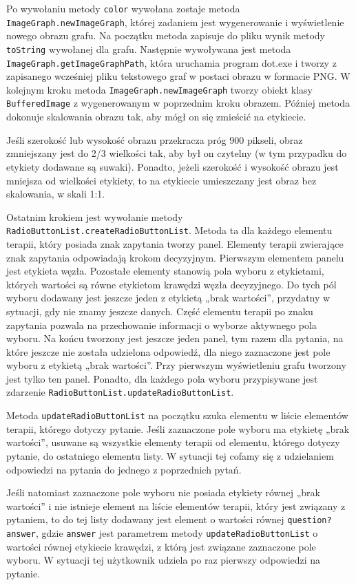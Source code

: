 Po wywołaniu metody \texttt{color} wywołana zostaje metoda \texttt{ImageGraph.newImageGraph}, której zadaniem jest wygenerowanie i wyświetlenie nowego obrazu grafu. Na początku metoda zapisuje do pliku wynik metody \texttt{toString} wywołanej dla grafu. Następnie wywoływana jest metoda \texttt{ImageGraph.getImageGraphPath}, która uruchamia program dot.exe i tworzy z zapisanego wcześniej pliku tekstowego graf w postaci obrazu w formacie PNG. W kolejnym kroku metoda \texttt{ImageGraph.newImageGraph} tworzy obiekt klasy \texttt{BufferedImage} z wygenerowanym w poprzednim kroku obrazem. Później metoda dokonuje skalowania obrazu tak, aby mógł on się zmieścić na etykiecie. 

Jeśli szerokość lub wysokość obrazu przekracza próg 900 pikseli, obraz zmniejszany jest do 2/3 wielkości tak, aby był on czytelny (w tym przypadku do etykiety dodawane są suwaki). Ponadto, jeżeli szerokość i wysokość obrazu jest mniejsza od wielkości etykiety, to na etykiecie umieszczany jest obraz bez skalowania, w skali 1:1.
 
Ostatnim krokiem jest wywołanie metody \texttt{RadioButtonList.createRadioButtonList}. Metoda ta dla każdego elementu terapii, który posiada znak zapytania tworzy panel. Elementy terapii zwierające znak zapytania odpowiadają krokom decyzyjnym. Pierwszym elementem panelu jest etykieta węzła. Pozostałe elementy stanowią pola wyboru z etykietami, których wartości są równe etykietom krawędzi węzła decyzyjnego. Do tych pól wyboru dodawany jest jeszcze jeden z etykietą „brak wartości”, przydatny w sytuacji, gdy nie znamy jeszcze danych. Część elementu terapii po znaku zapytania pozwala na przechowanie informacji o wyborze aktywnego pola wyboru. Na końcu tworzony jest jeszcze jeden panel, tym razem dla pytania, na które jeszcze nie została udzielona odpowiedź, dla niego zaznaczone jest pole wyboru z etykietą „brak wartości”. Przy pierwszym wyświetleniu grafu tworzony jest tylko ten panel. Ponadto, dla każdego pola wyboru przypisywane jest zdarzenie \texttt{RadioButtonList.updateRadioButtonList}.

Metoda \texttt{updateRadioButtonList} na początku szuka elementu w liście elementów terapii, którego dotyczy pytanie. Jeśli zaznaczone pole wyboru ma etykietę „brak wartości”, usuwane są wszystkie elementy terapii od elementu, którego dotyczy pytanie, do ostatniego elementu listy. W sytuacji tej cofamy się z udzielaniem odpowiedzi na pytania do jednego z poprzednich pytań.

Jeśli natomiast zaznaczone pole wyboru nie posiada etykiety równej „brak wartości” i nie istnieje element na liście elementów terapii, który jest związany z pytaniem, to do tej listy dodawany jest element o wartości równej \texttt{question?answer}, gdzie \texttt{answer} jest parametrem metody \texttt{updateRadioButtonList} o wartości równej etykiecie krawędzi, z którą jest związane zaznaczone pole wyboru. W sytuacji tej użytkownik udziela po raz pierwszy odpowiedzi na pytanie. 

